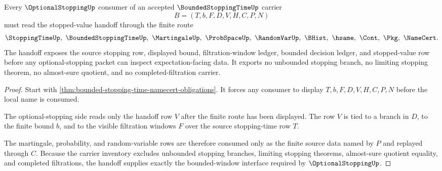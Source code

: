 \begin{theorem}
\label{thm:bounded-stopping-time-optional-stopping-handoff}
Every $\OptionalStoppingUp$ consumer of an accepted $\BoundedStoppingTimeUp$ carrier
$$
B=(T,b,F,D,V,H,C,P,N)
$$
must read the stopped-value handoff through the finite route
$$
\StoppingTimeUp,\ \BoundedStoppingTimeUp,\ \MartingaleUp,\ \ProbSpaceUp,\ \RandomVarUp,\ \BHist,\ \hsame,\ \Cont,\ \Pkg,\ \NameCert .
$$
The handoff exposes the source stopping row, displayed bound, filtration-window ledger, bounded decision ledger, and stopped-value row before any optional-stopping packet can inspect expectation-facing data. It exports no unbounded stopping branch, no limiting stopping theorem, no almost-sure quotient, and no completed-filtration carrier.
\end{theorem}
\begin{proof}
Start with \autoref{thm:bounded-stopping-time-namecert-obligations}. It forces any consumer to display $T,b,F,D,V,H,C,P,N$ before the local name is consumed.

The optional-stopping side reads only the handoff row $V$ after the finite route has been displayed. The row $V$ is tied to a branch in $D$, to the finite bound $b$, and to the visible filtration windows $F$ over the source stopping-time row $T$.

The martingale, probability, and random-variable rows are therefore consumed only as the finite source data named by $P$ and replayed through $C$. Because the carrier inventory excludes unbounded stopping branches, limiting stopping theorems, almost-sure quotient equality, and completed filtrations, the handoff supplies exactly the bounded-window interface required by $\OptionalStoppingUp$.
\end{proof}



